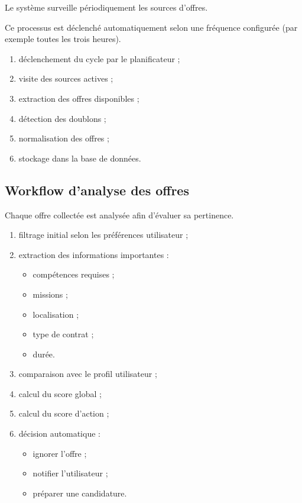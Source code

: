 \documentclass[11pt,a4paper]{article}
\begin{document}
Le système surveille périodiquement les sources d’offres.

Ce processus est déclenché automatiquement selon une fréquence configurée (par exemple toutes les trois heures).

\begin{enumerate}

\item déclenchement du cycle par le planificateur ;

\item visite des sources actives ;

\item extraction des offres disponibles ;

\item détection des doublons ;

\item normalisation des offres ;

\item stockage dans la base de données.

\end{enumerate}

\subsection{Workflow d'analyse des offres}

Chaque offre collectée est analysée afin d'évaluer sa pertinence.

\begin{enumerate}

\item filtrage initial selon les préférences utilisateur ;

\item extraction des informations importantes :

\begin{itemize}
\item compétences requises ;
\item missions ;
\item localisation ;
\item type de contrat ;
\item durée.
\end{itemize}

\item comparaison avec le profil utilisateur ;

\item calcul du score global ;

\item calcul du score d’action ;

\item décision automatique :

\begin{itemize}
\item ignorer l’offre ;
\item notifier l’utilisateur ;
\item préparer une candidature.
\end{itemize}

\end{enumerate}
\end{document}
